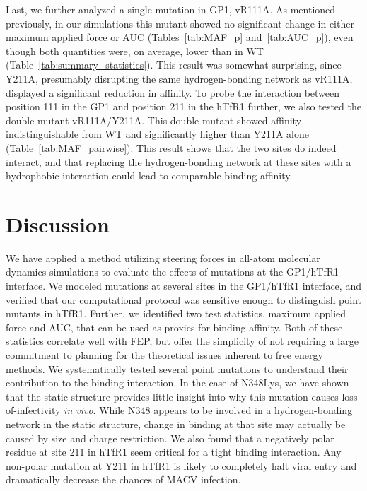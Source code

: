 \documentclass[12pt]{article}
\begin{document}
Last, we further analyzed a single mutation in GP1, vR111A. As mentioned previously, in our simulations this mutant showed no significant change in either maximum applied force or AUC (Tables~\ref{tab:MAF_p} and~\ref{tab:AUC_p}), even though both quantities were, on average, lower than in WT (Table~\ref{tab:summary_statistics}). This result was somewhat surprising, since Y211A, presumably disrupting the same hydrogen-bonding network as vR111A, displayed a significant reduction in affinity. To probe the interaction between position 111 in the GP1 and position 211 in the hTfR1 further, we also tested the double mutant vR111A/Y211A. This double mutant showed affinity indistinguishable from WT and significantly higher than Y211A alone  (Table~\ref{tab:MAF_pairwise}). This result shows that the two sites do indeed interact, and that replacing the hydrogen-bonding network at these sites with a hydrophobic interaction could lead to comparable binding affinity.

\section{Discussion}

We have applied a method utilizing steering forces in all-atom molecular dynamics simulations to evaluate the effects of mutations at the GP1/hTfR1 interface. We modeled mutations at several sites in the GP1/hTfR1 interface, and verified that our computational protocol was sensitive enough to distinguish point mutants in hTfR1. Further, we identified two test statistics, maximum applied force and AUC, that can be used as proxies for binding affinity. Both of these statistics correlate well with FEP, but offer the simplicity of not requiring a large commitment to planning for the theoretical issues inherent to free energy methods. We systematically tested several point mutations to understand their contribution to the binding interaction. In the case of N348Lys, we have shown that the static structure provides little insight into why this mutation causes loss-of-infectivity \textit{in vivo}. While N348 appears to be involved in a hydrogen-bonding network in the static structure, change in binding at that site may actually be caused by size and charge restriction. We also found that a negatively polar residue at site 211 in hTfR1 seem critical for a tight binding interaction. Any non-polar mutation at Y211 in hTfR1 is likely to completely halt viral entry and dramatically decrease the chances of MACV infection.
\end{document}
